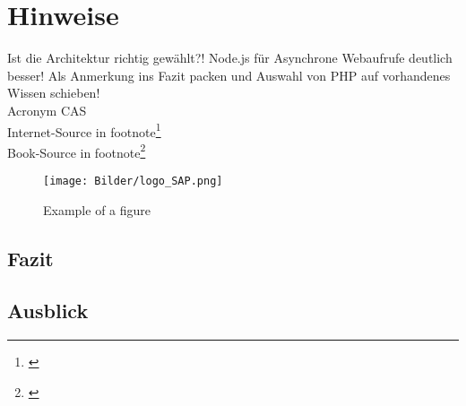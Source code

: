 \chapter{Hinweise}

Ist die Architektur richtig gewählt?! Node.js für Asynchrone Webaufrufe deutlich besser! Als Anmerkung ins Fazit packen und Auswahl von PHP auf vorhandenes Wissen  schieben!\\

Acronym \acf{CAS}\\

Internet-Source in footnote\footnote{\citep{cas}}\\

Book-Source in footnote\footnote{\citep{einfuehung_sap_hana}}\\

\begin{figure}[H]
	\centering
	{\texttt{[image: Bilder/logo\_SAP.png]}}
	\caption{Example of a figure \protect\citep[page 32]{cas}}
	\label{fig:Example}
\end{figure}


\section{Fazit}


\section{Ausblick}
